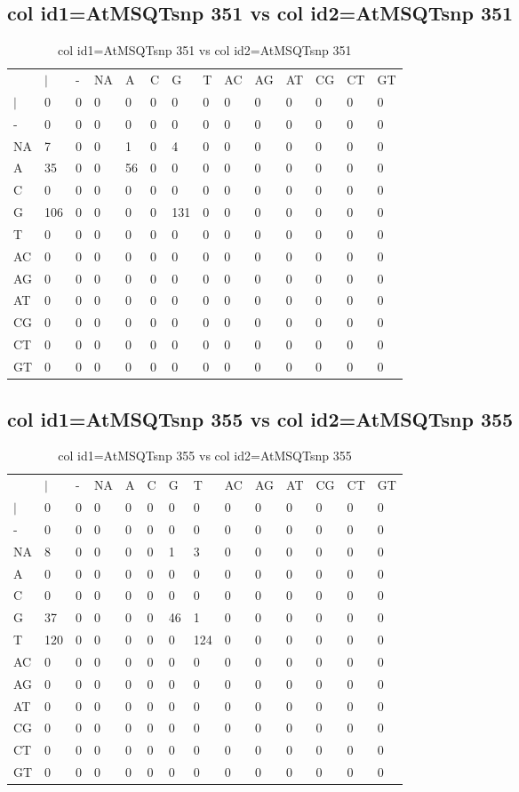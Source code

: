 \subsection{col id1=AtMSQTsnp 351 vs col id2=AtMSQTsnp 351}
\begin{center}
\begin{longtable}{|l|l|l|l|l|l|l|l|l|l|l|l|l|l|}
\caption{col id1=AtMSQTsnp 351 vs col id2=AtMSQTsnp 351} \label{table_dm868}\\
\hline
\\
\hline
&$|$&-&NA&A&C&G&T&AC&AG&AT&CG&CT&GT\\
$|$&0&0&0&0&0&0&0&0&0&0&0&0&0\\
-&0&0&0&0&0&0&0&0&0&0&0&0&0\\
NA&7&0&0&1&0&4&0&0&0&0&0&0&0\\
A&35&0&0&56&0&0&0&0&0&0&0&0&0\\
C&0&0&0&0&0&0&0&0&0&0&0&0&0\\
G&106&0&0&0&0&131&0&0&0&0&0&0&0\\
T&0&0&0&0&0&0&0&0&0&0&0&0&0\\
AC&0&0&0&0&0&0&0&0&0&0&0&0&0\\
AG&0&0&0&0&0&0&0&0&0&0&0&0&0\\
AT&0&0&0&0&0&0&0&0&0&0&0&0&0\\
CG&0&0&0&0&0&0&0&0&0&0&0&0&0\\
CT&0&0&0&0&0&0&0&0&0&0&0&0&0\\
GT&0&0&0&0&0&0&0&0&0&0&0&0&0\\
\hline
\end{longtable}
\end{center}

\subsection{col id1=AtMSQTsnp 355 vs col id2=AtMSQTsnp 355}
\begin{center}
\begin{longtable}{|l|l|l|l|l|l|l|l|l|l|l|l|l|l|}
\caption{col id1=AtMSQTsnp 355 vs col id2=AtMSQTsnp 355} \label{table_dm870}\\
\hline
\\
\hline
&$|$&-&NA&A&C&G&T&AC&AG&AT&CG&CT&GT\\
$|$&0&0&0&0&0&0&0&0&0&0&0&0&0\\
-&0&0&0&0&0&0&0&0&0&0&0&0&0\\
NA&8&0&0&0&0&1&3&0&0&0&0&0&0\\
A&0&0&0&0&0&0&0&0&0&0&0&0&0\\
C&0&0&0&0&0&0&0&0&0&0&0&0&0\\
G&37&0&0&0&0&46&1&0&0&0&0&0&0\\
T&120&0&0&0&0&0&124&0&0&0&0&0&0\\
AC&0&0&0&0&0&0&0&0&0&0&0&0&0\\
AG&0&0&0&0&0&0&0&0&0&0&0&0&0\\
AT&0&0&0&0&0&0&0&0&0&0&0&0&0\\
CG&0&0&0&0&0&0&0&0&0&0&0&0&0\\
CT&0&0&0&0&0&0&0&0&0&0&0&0&0\\
GT&0&0&0&0&0&0&0&0&0&0&0&0&0\\
\hline
\end{longtable}
\end{center}

